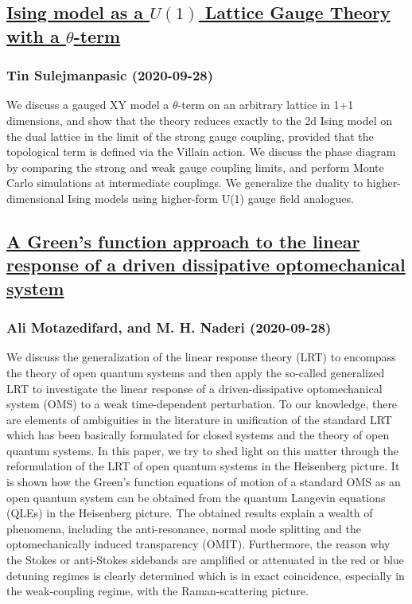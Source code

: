 \subsection*{\href{http://arxiv.org/abs/2009.13383v1}{Ising model as a $U(1)$ Lattice Gauge Theory with a $θ$-term}}
\subsubsection*{Tin Sulejmanpasic (2020-09-28)}
We discuss a gauged XY model a $\theta$-term on an arbitrary lattice in 1+1
dimensions, and show that the theory reduces exactly to the 2d Ising model on
the dual lattice in the limit of the strong gauge coupling, provided that the
topological term is defined via the Villain action. We discuss the phase
diagram by comparing the strong and weak gauge coupling limits, and perform
Monte Carlo simulations at intermediate couplings. We generalize the duality to
higher-dimensional Ising models using higher-form U(1) gauge field analogues.

\subsection*{\href{http://arxiv.org/abs/2009.13381v1}{A Green's function approach to the linear response of a driven  dissipative optomechanical system}}
\subsubsection*{Ali Motazedifard, and M. H. Naderi (2020-09-28)}
We discuss the generalization of the linear response theory (LRT) to
encompass the theory of open quantum systems and then apply the so-called
generalized LRT to investigate the linear response of a driven-dissipative
optomechanical system (OMS) to a weak time-dependent perturbation. To our
knowledge, there are elements of ambiguities in the literature in unification
of the standard LRT which has been basically formulated for closed systems and
the theory of open quantum systems. In this paper, we try to shed light on this
matter through the reformulation of the LRT of open quantum systems in the
Heisenberg picture. It is shown how the Green's function equations of motion of
a standard OMS as an open quantum system can be obtained from the quantum
Langevin equations (QLEs) in the Heisenberg picture. The obtained results
explain a wealth of phenomena, including the anti-resonance, normal mode
splitting and the optomechanically induced transparency (OMIT). Furthermore,
the reason why the Stokes or anti-Stokes sidebands are amplified or attenuated
in the red or blue detuning regimes is clearly determined which is in exact
coincidence, especially in the weak-coupling regime, with the Raman-scattering
picture.

